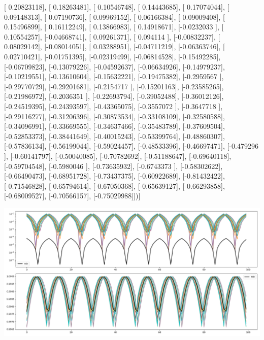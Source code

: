 \documentclass{article}
\begin{document}
       [ 0.20823118],
       [ 0.18263481],
       [ 0.10546748],
       [ 0.14443685],
       [ 0.17074044],
       [ 0.09148313],
       [ 0.07190736],
       [ 0.09969152],
       [ 0.06166384],
       [ 0.09009408],
       [ 0.15496899],
       [ 0.16112249],
       [ 0.13866983],
       [ 0.14918671],
       [-0.0232033 ],
       [ 0.10554257],
       [-0.04668741],
       [ 0.09261371],
       [ 0.094114  ],
       [-0.00832237],
       [ 0.08029142],
       [-0.08014051],
       [ 0.03288951],
       [-0.04711219],
       [-0.06363746],
       [ 0.02710421],
       [-0.01751395],
       [-0.02319499],
       [-0.06814528],
       [-0.15492285],
       [-0.06709823],
       [-0.13079226],
       [-0.04592637],
       [-0.06634926],
       [-0.14979237],
       [-0.10219551],
       [-0.13610604],
       [-0.15632221],
       [-0.19475382],
       [-0.2959567 ],
       [-0.29770729],
       [-0.29201681],
       [-0.2154717 ],
       [-0.15201163],
       [-0.23585265],
       [-0.21986972],
       [-0.2036351 ],
       [-0.22693794],
       [-0.39052488],
       [-0.36012126],
       [-0.24519395],
       [-0.24393597],
       [-0.43365075],
       [-0.3557072 ],
       [-0.3647718 ],
       [-0.29116277],
       [-0.31206396],
       [-0.30873534],
       [-0.33108109],
       [-0.32580588],
       [-0.34096991],
       [-0.33669555],
       [-0.34637466],
       [-0.35483789],
       [-0.37609504],
       [-0.52853373],
       [-0.38441649],
       [-0.40015243],
       [-0.53399764],
       [-0.48860307],
       [-0.57836134],
       [-0.56199044],
       [-0.59024457],
       [-0.48533396],
       [-0.46697471],
       [-0.479296  ],
       [-0.60141797],
       [-0.50040085],
       [-0.70782692],
       [-0.51188647],
       [-0.69640118],
       [-0.59704548],
       [-0.5980046 ],
       [-0.73635932],
       [-0.6743373 ],
       [-0.58302622],
       [-0.66490473],
       [-0.68951728],
       [-0.73437375],
       [-0.60922689],
       [-0.81432422],
       [-0.71546828],
       [-0.65794614],
       [-0.67050368],
       [-0.65639127],
       [-0.66293858],
       [-0.68009527],
       [-0.70566157],
       [-0.75029988]])]
\begin{center}
\includegraphics[scale=.9]{control_dpn_all.png}

\end{center}
\end{document}
